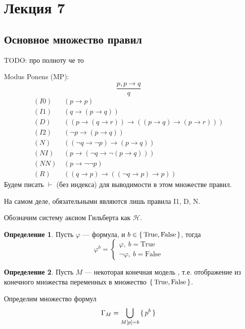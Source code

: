 \documentclass[12pt]{article}
\let\im\rightarrow
\let\n\neg
\theoremstyle{definition}
\newtheorem{definition}{Определение}[section]
\theoremstyle{statement}
\theoremstyle{theorem}
\begin{document}
\pagebreak

\section{Лекция 7}

\subsection{Основное множество правил}

TODO: про полноту че то

Modus Ponens (MP):
\[
  \frac{p, p \im q}{q}
\]
\begin{align*}
  (I0)\ &(p \im p)\\
  (I1)\ &(q \im (p \im q))\\
  (D)\ &((p \im (q \im r)) \im ((p \im q) \im (p \im r)))\\
  (I2)\ &(\n p \im (p \im q))\\
  (N)\ &((\n q \im \n p) \im (p \im q))\\
  (NI)\ &(p \im (\n q \im \n (p \im q)))\\
  (NN)\ &(p \im \n\n p)\\
  (R)\ &((q \im p) \im ((\n q \im p) \im p))
\end{align*}
Будем писать $\vdash$ (без индекса) для выводимости в этом множестве правил.

На самом деле, обязательными являются лишь правила I1, D, N.

Обозначим систему аксиом Гильберта как $\mathcal{H}$.

\begin{definition}
  Пусть $\varphi$ --- формула, и $b \in \set{\mathrm{True},
  \mathrm{False}}$, тогда
  \[
    \varphi^b =
    \begin{cases}
      \varphi,\ b = \mathrm{True}\\
      \n \varphi,\ b = \mathrm{False}
    \end{cases}
  \]
\end{definition}

\begin{definition}
  Пусть $M$ --- некоторая конечная модель , т.е. отображение из
  конечного множества переменных в множество $\set{\mathrm{True},
  \mathrm{False}}$.

  Определим множество формул
  \[
    \Gamma_M = \bigcup_{M[p] = b} \set{p^b}
  \]
\end{definition}
\end{document}
